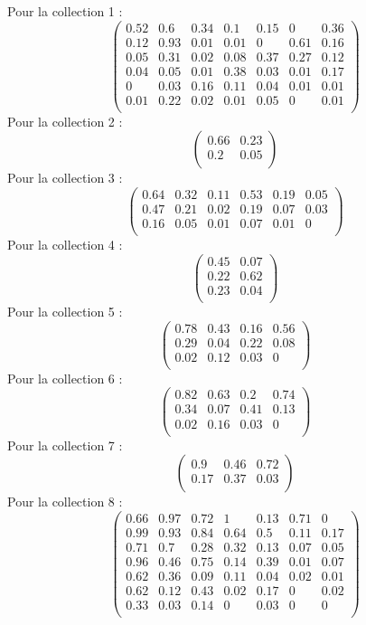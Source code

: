 Pour la collection 1 :
\[\begin{pmatrix} 0.52 &0.6 &0.34 &0.1 &0.15 &0 &0.36 \\0.12 &0.93 &0.01 &0.01 &0 &0.61 &0.16 \\0.05 &0.31 &0.02 &0.08 &0.37 &0.27 &0.12 \\0.04 &0.05 &0.01 &0.38 &0.03 &0.01 &0.17 \\0 &0.03 &0.16 &0.11 &0.04 &0.01 &0.01 \\0.01 &0.22 &0.02 &0.01 &0.05 &0 &0.01 \\ \end{pmatrix}\]
Pour la collection 2 :
\[\begin{pmatrix} 0.66 &0.23 \\0.2 &0.05 \\ \end{pmatrix}\] Pour la
collection 3 :
\[\begin{pmatrix} 0.64 &0.32 &0.11 &0.53 &0.19 &0.05 \\0.47 &0.21 &0.02 &0.19 &0.07 &0.03 \\0.16 &0.05 &0.01 &0.07 &0.01 &0 \\ \end{pmatrix}\]
Pour la collection 4 :
\[\begin{pmatrix} 0.45 &0.07 \\0.22 &0.62 \\0.23 &0.04 \\ \end{pmatrix}\]
Pour la collection 5 :
\[\begin{pmatrix} 0.78 &0.43 &0.16 &0.56 \\0.29 &0.04 &0.22 &0.08 \\0.02 &0.12 &0.03 &0 \\ \end{pmatrix}\]
Pour la collection 6 :
\[\begin{pmatrix} 0.82 &0.63 &0.2 &0.74 \\0.34 &0.07 &0.41 &0.13 \\0.02 &0.16 &0.03 &0 \\ \end{pmatrix}\]
Pour la collection 7 :
\[\begin{pmatrix} 0.9 &0.46 &0.72 \\0.17 &0.37 &0.03 \\ \end{pmatrix}\]
Pour la collection 8 :
\[\begin{pmatrix} 0.66 &0.97 &0.72 &1 &0.13 &0.71 &0 \\0.99 &0.93 &0.84 &0.64 &0.5 &0.11 &0.17 \\0.71 &0.7 &0.28 &0.32 &0.13 &0.07 &0.05 \\0.96 &0.46 &0.75 &0.14 &0.39 &0.01 &0.07 \\0.62 &0.36 &0.09 &0.11 &0.04 &0.02 &0.01 \\0.62 &0.12 &0.43 &0.02 &0.17 &0 &0.02 \\0.33 &0.03 &0.14 &0 &0.03 &0 &0 \\ \end{pmatrix}\]
